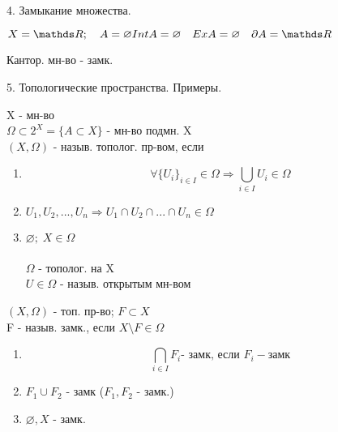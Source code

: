\documentclass[11pt, fleqn]{article}
\begin{document}
\begin{question}{4. Замыкание множества.}
        \begin{example}
            $X = \R; \quad A = \varnothing \\
            Int A = \varnothing \quad Ex A = \varnothing \quad \partial A = \R$
        \end{example}

        \begin{example}
            Кантор. мн-во - замк. \\
        \end{example}
    \end{question}

    \begin{question}{5. Топологические пространства. Примеры.}
        \begin{definition}
            X - мн-во\\
            $\Omega \subset 2^X = \{A \subset X\}$ - мн-во подмн. X\\
            $(X, \Omega)$ - назыв. тополог. пр-вом, если\\
            \begin{enumerate}
                \item \[\forall \{U_i\}_{i \in I} \in \Omega \Rightarrow\bigcup_{i \in I} U_i \in \Omega\]
                \item $U_1, U_2, ..., U_n \Rightarrow U_1 \cap U_2 \cap ... \cap U_n \in \Omega$
                \item $\varnothing; \; X \in \Omega$\\\\
                $\Omega$ - тополог. на X\\
                $U \in \Omega$ - назыв. открытым мн-вом
            \end{enumerate}
        \end{definition}

        \begin{definition}
            $(X, \Omega)$ - топ. пр-во; $F \subset X$ \\
            F - назыв. замк., если $X \setminus F \in \Omega$
        \end{definition}

        \begin{theorem}
            \begin{enumerate}
                \item \[\bigcap_{i \in I} F_i \text{- замк, если } F_i - \text{замк}\]
                \item $F_1 \cup F_2$ - замк ($F_1, F_2$ - замк.)
                \item $\varnothing, X$ - замк.
            \end{enumerate}
        \end{theorem}


\end{question}
\end{document}
